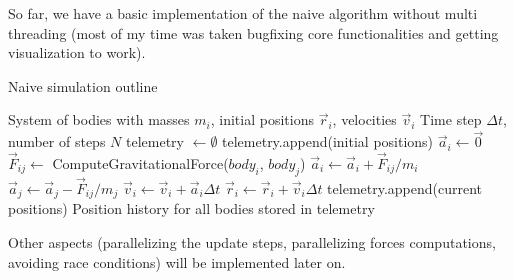 \documentclass{article}
\begin{document}
So far, we have a basic implementation of the naive algorithm without multi threading (most of my time was taken bugfixing core functionalities and getting visualization to work). 

\begin{algorithm}
    \caption{Naive simulation outline}\label{alg:cap}
    \begin{algorithmic}
        \Require System of bodies with masses $m_i$, initial positions $\vec{r}_i$, velocities $\vec{v}_i$
        \Require Time step $\Delta t$, number of steps $N$
        \State telemetry $\gets \emptyset$
        \State telemetry.append(initial positions)
                \State $\vec{a}_i \gets \vec{0}$ 
            \EndFor
                    \State $\vec{F}_{ij} \gets$ ComputeGravitationalForce($body_i$, $body_j$)
                    \State $\vec{a}_i \gets \vec{a}_i + \vec{F}_{ij}/m_i$
                    \State $\vec{a}_j \gets \vec{a}_j - \vec{F}_{ij}/m_j$
                \EndFor
            \EndFor
                \State $\vec{v}_i \gets \vec{v}_i + \vec{a}_i\Delta t$ 
                \State $\vec{r}_i \gets \vec{r}_i + \vec{v}_i\Delta t$ 
            \EndFor
            \State telemetry.append(current positions)
        \EndFor
        \Ensure Position history for all bodies stored in telemetry
    \end{algorithmic}
\end{algorithm}

Other aspects (parallelizing the update steps, parallelizing forces computations, avoiding race conditions) will be implemented later on.
\end{document}
